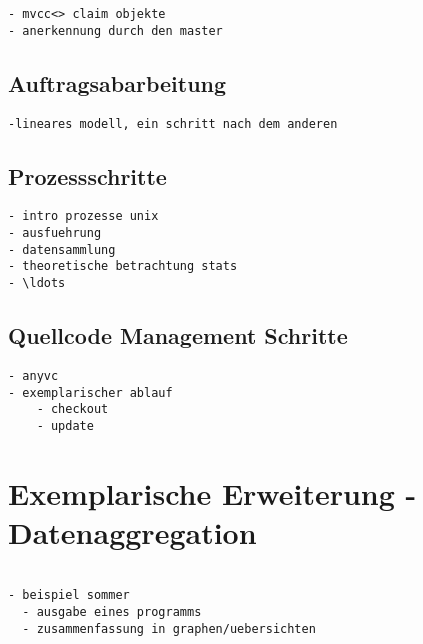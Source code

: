 \begin{verbatim}
- mvcc<> claim objekte
- anerkennung durch den master

\end{verbatim}

\subsection{Auftragsabarbeitung}
\begin{verbatim}
-lineares modell, ein schritt nach dem anderen
\end{verbatim}

\subsection{Prozessschritte}

\begin{verbatim}
- intro prozesse unix
- ausfuehrung
- datensammlung
- theoretische betrachtung stats
- \ldots
\end{verbatim}

\subsection{Quellcode Management Schritte}


\begin{verbatim}
- anyvc
- exemplarischer ablauf
    - checkout
    - update
\end{verbatim}

\section{Exemplarische Erweiterung - Datenaggregation}

 
\begin{verbatim}

- beispiel sommer
  - ausgabe eines programms
  - zusammenfassung in graphen/uebersichten

\end{verbatim}


